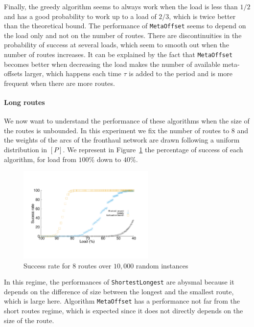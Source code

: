 \documentclass[a4paper,10pt]{article}
\newcommand\shortestlongest{\texttt{ShortestLongest}\xspace}
\newcommand\metaoffset{\texttt{MetaOffset}\xspace}
\begin{document}
      Finally, the greedy algorithm seems to always work when the load is less than $1/2$ and has a good probability to work up to a load of $2/3$, which is twice better than the theoretical bound. The performance of \metaoffset seems to depend on the load only and not on the number of routes. There are discontinuities in the probability of success at several loads, which seem to smooth out when the number of routes increases. It can be explained by the fact that \metaoffset becomes better when decreasing the load makes the number of available meta-offsets larger, which happens each time $\tau$ is added to the period and is more frequent when there are more routes.
      
        \paragraph{Long routes}
      
      We now want to understand the performance of these algorithms when the size of the routes is unbounded. In this experiment we fix the number of routes to $8$ and the weights of the arcs of the fronthaul network are drawn following a uniform distribution in $[P]$. We represent in Figure~\ref{fig:long} the percentage of success of each algorithm, for load from $100\%$ down to $40\%$.
\begin{figure}[h]

       \begin{center}
      \includegraphics[width=0.6\textwidth]{echec_longues.pdf}
      \end{center}
        
      \caption{Success rate for $8$ routes over $10,000$ random instances}\label{fig:long}
     \end{figure}
      
In this regime, the performances of \shortestlongest are abysmal because it depends on the difference of size between the longest and the smallest route, which is large here.  Algorithm \metaoffset has a performance not far from the short routes regime, which is expected since it does not directly depends on the size of the route. 
      
\end{document}
